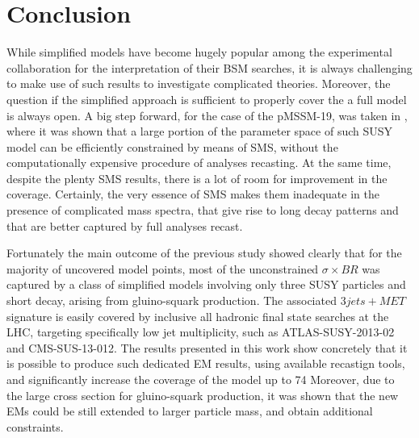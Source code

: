 \documentclass[epj,nopacs,fleqn]{svjour}
\begin{document}
\section{Conclusion}\label{sec:conclusion}
While simplified models have become hugely popular among the experimental collaboration for the interpretation of their BSM searches, it is always challenging to make use of such results to investigate complicated theories. Moreover, the question if the simplified approach is sufficient to properly cover the a full model is always open. A big step forward, for the case of the pMSSM-19, was taken in \cite{} , where it was shown that a large portion of the parameter space of such SUSY model can be efficiently constrained by means of SMS, without the computationally expensive procedure of analyses recasting. At the same time,  despite the plenty SMS results, there is a lot of room for improvement in the coverage. Certainly, the very essence of SMS makes them inadequate in the presence of  complicated mass spectra, that give rise to long decay patterns and that are better captured by full analyses recast. 

Fortunately the main outcome of the previous study showed clearly that for the majority of uncovered model points, most of the unconstrained $\sigma \times BR$ was captured by a class of simplified models involving only three SUSY particles and short decay, arising from gluino-squark production. The associated $3jets + MET$ signature is easily covered by inclusive all hadronic final state searches at the LHC, targeting specifically low jet multiplicity, such as ATLAS-SUSY-2013-02 and CMS-SUS-13-012. The results presented in this work show concretely that  it is possible to produce such dedicated EM results, using available recastign tools, and significantly increase the coverage of the model up to 74%
Moreover, due to the large cross section for gluino-squark production, it was shown that the new EMs could be still extended to larger particle mass, and obtain additional constraints. 
\end{document}
